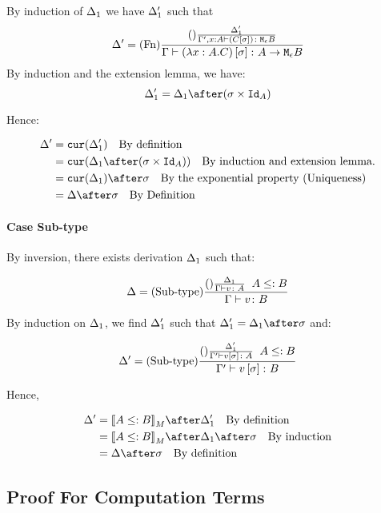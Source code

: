 \documentclass{report}
\begin{document}
By induction of $\Delta_1$ we have $\Delta_1'$ such that
\begin{equation}
    \Delta' = (\text{Fn}) \frac{
        (\text{}) \frac{\Delta_1'}{\Gamma', x:A \vdash (C\left[\sigma\right]) \colon \texttt{M}_{\epsilon}{B}}
    }{\Gamma \vdash (\lambda x : A. C)\left[\sigma\right] \colon A \rightarrow \texttt{M}_{\epsilon}{B}}
\end{equation}
By induction and the extension lemma, we have:
\begin{equation}
    \D_1' = \D_1\after(\si\times\Id{A})
\end{equation}

Hence:

\begin{align}
    \D' &= \cur{\D_1'}\qt{By definition}\\
        &= \cur{\D_1\after(\si\times\Id{A})}\qt{By induction and extension lemma.}\\
        & = \cur{\D_1}\after\si\qt{By the exponential property (Uniqueness)}\\
        &= \D\after\si\qt{By Definition}\\
\end{align}
\paragraph{Case Sub-type}
By inversion, there exists derivation $\Delta_1$ such that:

\begin{equation}
    \Delta = (\text{Sub-type}) \frac{(\text{}) \frac{\Delta_1}{\Gamma \vdash v \colon A}\;\; A\leq: B}{\Gamma \vdash v \colon B}
\end{equation}

By induction on $\Delta_1$, we find $\Delta_1'$ such that $\D_1' = \D_1\after\si$ and:

\begin{equation}
    \Delta' = (\text{Sub-type}) \frac{(\text{}) \frac{\Delta_1'}{\Gamma' \vdash v\left[\sigma\right] \colon A}\;\; A\leq: B}{\Gamma' \vdash v\left[\sigma\right] \colon B}
\end{equation}

Hence,

\begin{align}
    \D' &= \deno{A\subtype B}\after\D_1'\qt{By definition}\\
        &= \deno{A\subtype B}\after\D_1\after\si\qt{By induction}\\
        &= \D\after\si\qt{By definition}\\
\end{align}
\subsection{Proof For Computation Terms}
\end{document}
